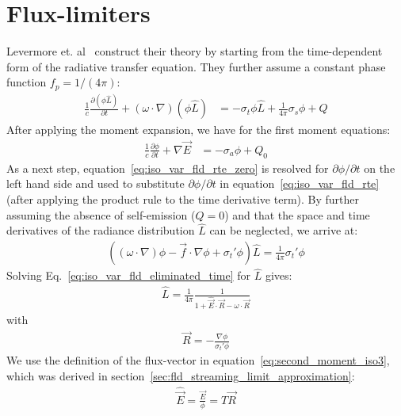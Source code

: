 \section{Flux-limiters}
\label{sec:fld_vef_factors}

Levermore et. al~\cite{Levermore81} construct their theory by starting from the time-dependent form of the radiative transfer equation. They further assume a constant phase function $f_p=1/(4\pi)$:
\begin{align}
\label{eq:iso_var_fld_rte}
\frac{1}{c}\frac{\partial (\phi\hat{L})}{\partial t} + \left(\omega\cdot\nabla\right)(\phi\hat{L})&=-\sigma_t\phi\hat{L} + \frac{1}{4\pi}\sigma_s\phi + Q
\end{align}
After applying the moment expansion, we have for the first moment equations:
\begin{align}
\label{eq:iso_var_fld_rte_zero}
\frac{1}{c}\frac{\partial \phi}{\partial t} + \nabla\vec{E} &= -\sigma_a\phi + Q_0
\end{align}
As a next step, equation~\ref{eq:iso_var_fld_rte_zero} is resolved for $\partial \phi/\partial t$ on the left hand side and used to substitute $\partial\phi/\partial t$ in equation~\ref{eq:iso_var_fld_rte} (after applying the product rule to the time derivative term). By further assuming the absence of self-emission ($Q=0$) and that the space and time derivatives of the radiance distribution $\hat{L}$ can be neglected, we arrive at:
\begin{align}
\label{eq:iso_var_fld_eliminated_time}
\left( \left(\omega\cdot\nabla\right)\phi -\vec{f}\cdot\nabla\phi + \sigma_t'\phi\right)\hat{L} = \frac{1}{4\pi}\sigma_t'\phi
\end{align}
Solving Eq.~\ref{eq:iso_var_fld_eliminated_time} for $\hat{L}$ gives:
\begin{align}
\label{eq:iso_var_fld_Lhat}
\hat{L} = \frac{1}{4\pi}\frac{1}{1+\widehat{\vec{E}}\cdot\vec{R}-\omega\cdot\vec{R}}
\end{align}
with
\begin{align}
\label{eq:iso_var_fld_R}
\vec{R} = -\frac{\nabla\phi}{\sigma_t'\phi}
\end{align}
We use the definition of the flux-vector in equation~\ref{eq:second_moment_iso3}, which was derived in section~\ref{sec:fld_streaming_limit_approximation}:
\begin{align}
\widehat{\vec{E}} = \frac{\vec{E}}{\phi}= T\vec{R}
\label{eq:iso_var_fld_normalized_flux}
\end{align}


